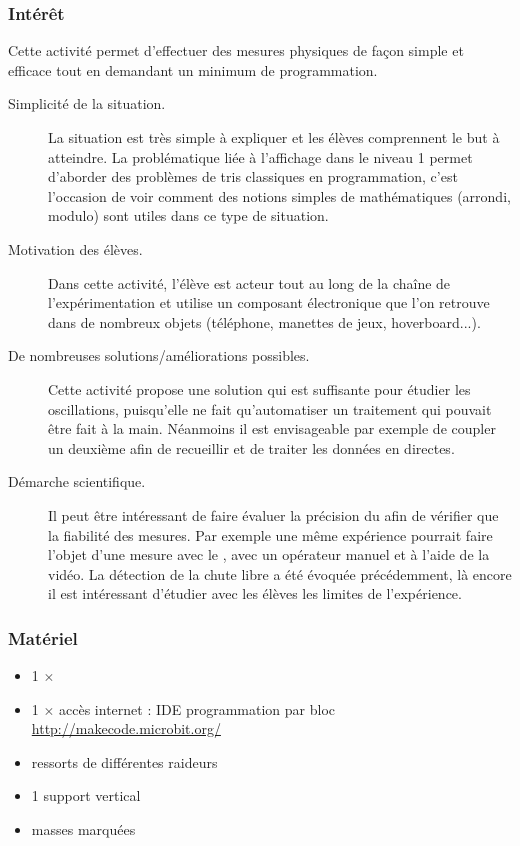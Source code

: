 \subsubsection{Intérêt}
Cette activité permet d'effectuer des mesures physiques de façon simple et efficace tout en demandant un minimum de programmation. 
\begin{description}
    \item [Simplicité de la situation.] La situation est très simple à expliquer et les élèves comprennent le but à atteindre. La problématique liée à l'affichage dans le niveau 1 permet d'aborder des problèmes de tris classiques en programmation, c'est l'occasion de voir comment des notions simples de mathématiques (arrondi, modulo) sont utiles dans ce type de situation. 
    \item [Motivation des élèves.] Dans cette activité, l'élève est acteur tout au long de la chaîne de l'expérimentation et utilise un composant électronique que l'on retrouve dans de nombreux objets (téléphone, manettes de jeux, hoverboard...).
    \item [De nombreuses solutions/améliorations possibles.] Cette activité propose une solution qui est suffisante pour étudier les oscillations, puisqu'elle ne fait qu'automatiser un traitement qui pouvait être fait à la main. Néanmoins il est envisageable par exemple de coupler un deuxième \mb afin de recueillir et de traiter les données en directes. 
    \item [Démarche scientifique.] Il peut être intéressant de faire évaluer la précision du \mb afin de vérifier que la fiabilité des mesures. Par exemple une même expérience pourrait faire l'objet d'une mesure avec le \mb , avec un opérateur manuel et à l'aide de la vidéo. La détection de la chute libre a été évoquée précédemment, là encore il est intéressant d'étudier avec les élèves les limites de l'expérience.
\end{description}


\subsubsection{Matériel}
\begin{itemize}
    \item 1 $\times$ \matosMb
    \item 1 $\times$ accès internet : IDE programmation par bloc \url{http://makecode.microbit.org/}
    \item ressorts de différentes raideurs
    \item 1 support vertical
    \item masses marquées
\end{itemize}


